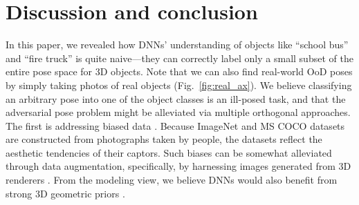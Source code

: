\documentclass[10pt,twocolumn,letterpaper]{article}
\begin{document}


\section{Discussion and conclusion}

In this paper, we revealed how DNNs' understanding of objects like ``school bus'' and ``fire truck'' is quite naive---they can correctly label only a small subset of the entire pose space for 3D objects.
Note that we can also find real-world OoD poses by simply taking photos of real objects (Fig.~\ref{fig:real_ax}).
%
We believe classifying an arbitrary pose into one of the object classes is an ill-posed task, and that the adversarial pose problem might be alleviated via multiple orthogonal approaches.
The first is addressing biased data \cite{torralba2011unbiased}.
Because ImageNet and MS COCO datasets are constructed from photographs taken by people, the datasets reflect the aesthetic tendencies of their captors.
Such biases can be somewhat alleviated through data augmentation, specifically, by harnessing images generated from 3D renderers \cite{shrivastava2017learning,alhaija2018geometric}.
From the modeling view, we believe DNNs would also benefit from strong 3D geometric priors \cite{alhaija2018geometric}.
\end{document}
